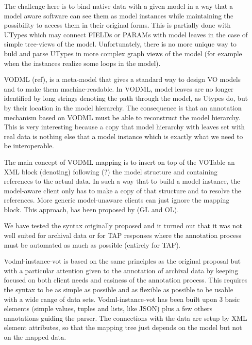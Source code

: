 \documentclass[11pt,a4paper]{ivoa}
\begin{document}
The challenge here is to bind native data with a given model in a way that a model aware software can see them as model instances while maintaining the possibility to access them in their original forms.
This is partially done with UTypes which may connect FIELDs or PARAMs with model leaves in the case of simple tree-views of the model. Unfortunately, there is no more unique  way to buld and parse UTypes in more complex graph views of the model (for example when the instances realize some loops in the model). 


VODML (ref),  is a meta-model that gives a standard way to design VO models and to make them machine-readable.
In VODML, model leaves are no longer identified by long strings denoting the path through the model, as Utypes do,  but by their location in the model hierarchy.
The consequence is that an annotation mechanism based on VODML must be able to reconstruct the model hierarchy. This is very interesting because a copy that model hierarchy with leaves set with real data is nothing else that a model instance which is exactly what we need to be interoperable.

The main concept of VODML mapping is to insert on  top of the VOTable an XML block (denoting) following (?)  the model structure and containing references to the actual data.
In such a way that to build a model instance, the model-aware client only has to make a copy of that structure and to resolve the references. More generic model-unaware clients can just ignore the mapping block. This approach, has been proposed by (GL and OL). 

We have tested the syntax originally proposed and it turned out that it was not well suited for archival data or for TAP responses where the annotation process must be automated as much as possible (entirely for TAP). 

Vodml-instance-vot is based on the same principles as the original proposal but with a particular attention given to the annotation of archival data by keeping focused on both client needs and easiness of the annotation process.
This requires the syntax to be as simple as possible and as flexible as possible to be usable with a wide range of data sets.
Vodml-instance-vot  has been built upon 3 basic elements (simple values,  tuples and  lists, like JSON)  plus a few others annotations guiding the parser.
The connections with the data are setup by XML element attributes, so that the mapping tree just depends on the model but not on the mapped data.
\end{document}

